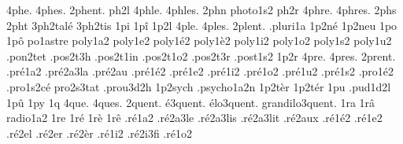 {4phe.
4phes.
2phent. %
ph2l
4phle.
4phles.
2phn
                    photo1s2
ph2r
4phre.
4phres.
2phs
2pht
                    3ph2tal\'e
                    3ph2tis
1pi
1p\^i
1p2l
4ple.
4ples.
2plent. %
                    .pluri1a
                    1p2n\'e
                    1p2neu
1po
1p\^o
                    po1astre
                    poly1a2
                    poly1e2
                    poly1\'e2
                    poly1\`e2
                    poly1i2
                    poly1o2
                    poly1s2
                    poly1u2
                    .pon2tet %
                    .pos2t3h
                    .pos2t1in
                    .pos2t1o2
                    .pos2t3r
                    .post1s2
1p2r
4pre.
4pres.
2prent. %
                    .pr\'e1a2
                    .pr\'e2a3la %
                    .pr\'e2au
                    .pr\'e1\'e2
                    .pr\'e1e2
                    .pr\'e1i2
                    .pr\'e1o2
                    .pr\'e1u2
                    .pr\'e1s2
                    .pro1\'e2
                    .pro1s2c\'e
                    pro2s3tat
                    .prou3d2h
                    1p2sych
                    .psycho1a2n
                    1p2t\`er
                    1p2t\'er
1pu
                    .pud1d2l
1p\^u
1py
1q
4que.
4ques.
        2quent.
     \'e3quent.
   \'elo3quent.
grandilo3quent.
1ra
1r\^a
                    radio1a2 %
1re
1r\'e
1r\`e
1r\^e
                    .r\'e1a2
                    .r\'e2a3le
                    .r\'e2a3lis
                    .r\'e2a3lit
                    .r\'e2aux
                    .r\'e1\'e2
                    .r\'e1e2
                    .r\'e2el
                    .r\'e2er
                    .r\'e2\`er
                    .r\'e1i2
                    .r\'e2i3fi
                    .r\'e1o2
}
